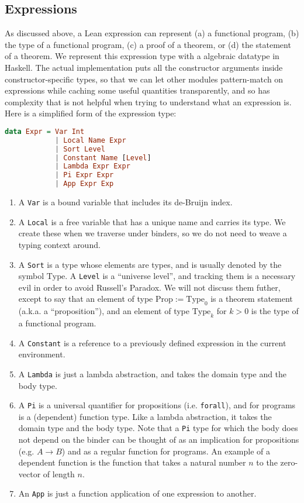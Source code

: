 \documentclass{article}
\begin{document}
\begin{spacing}{1.1}
\subsection{Expressions}
As discussed above, a Lean expression can represent (a) a functional program, (b) the type of a functional program, (c) a proof of a theorem, or (d) the statement of a theorem. We represent this expression type with a algebraic datatype in Haskell. The actual implementation puts all the constructor arguments inside constructor-specific types, so that we can let other modules pattern-match on expressions while caching some useful quantities transparently, and so has complexity that is not helpful when trying to understand what an expression is.  Here is a simplified form of the expression type:
\begin{lstlisting}[language=Haskell]
  data Expr = Var Int
            | Local Name Expr
            | Sort Level
            | Constant Name [Level]
            | Lambda Expr Expr
            | Pi Expr Expr
            | App Expr Exp
\end{lstlisting}
\begin{enumerate}
  \item A \lstinline{Var} is a bound variable that includes its de-Bruijn index.
  \item A \lstinline{Local} is a free variable that has a unique name and carries its type. We create these when we traverse under binders, so we do not need to weave a typing context around.
  \item A \lstinline{Sort} is a type whose elements are types, and is usually denoted by the symbol \( \mathrm{Type} \). A \lstinline{Level} is a ``universe level'', and tracking them is a necessary evil in order to avoid Russell's Paradox. We will not discuss them futher, except to say that an element of type \( \mathrm{Prop} := \mathrm{Type}_0 \) is a theorem statement (a.k.a. a ``proposition''), and an element of type \( \mathrm{Type}_k \) for \( k > 0 \) is the type of a functional program.
  \item A \lstinline{Constant} is a reference to a previously defined expression in the current environment.
  \item A \lstinline{Lambda} is just a lambda abstraction, and takes the domain type and the body type.
  \item A \lstinline{Pi} is a universal quantifier for propositions (i.e. \lstinline{forall}), and for programs is a (dependent) function type. Like a lambda abstraction, it takes the domain type and the body type. Note that a \lstinline{Pi} type for which the body does not depend on the binder can be thought of as an implication for propositions (e.g. \( A \to B \)) and as a regular function for programs. An example of a dependent function is the function that takes a natural number \( n \) to the zero-vector of length \( n \).
  \item An \lstinline{App} is just a function application of one expression to another.
\end{enumerate}


\end{spacing}
\end{document}
